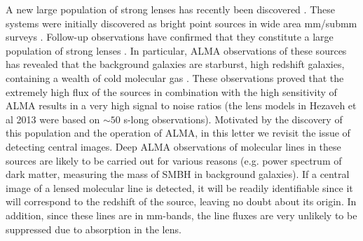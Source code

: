\documentclass[chicago]{emulateapj}
\begin{document}
A new large population of strong lenses has recently been discovered \citep{}. These systems were initially discovered as bright point sources in wide area mm/submm surveys \citep{}. Follow-up observations have confirmed that they constitute a large population of strong lenses \citep{}.
In particular, ALMA observations of these sources has revealed that the background galaxies are starburst, high redshift galaxies, containing a wealth of cold molecular gas \cite{}.  These observations proved that the extremely high flux of the sources in combination with the high sensitivity of ALMA results in a very high signal to noise ratios (the lens models in Hezaveh et al 2013 were based on $\sim50$ s-long observations).
Motivated by the discovery of this population and the operation of ALMA, in this letter we revisit the issue of detecting central images.
Deep ALMA observations of molecular lines in these sources are likely to be carried out for various reasons (e.g. power spectrum of dark matter, measuring the mass of SMBH in background galaxies). If a central image of a lensed molecular line is detected, it will be readily identifiable since it will correspond to the redshift of the source, leaving no doubt about its origin. In addition, since these lines are in mm-bands, the line fluxes are very unlikely to be suppressed due to absorption in the lens. 

\end{document}

